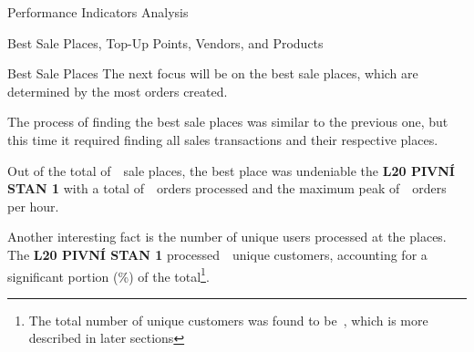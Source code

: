 \begin{section}{Performance Indicators Analysis}
\begin{subsection}{Best Sale Places, Top-Up Points, Vendors, and Products}
\begin{subsubsection}{Best Sale Places}
			The next focus will be on the best sale places, which are determined by the most orders created.


			The process of finding the best sale places was similar to the previous one, but this time it required finding all sales transactions and their respective places.

			Out of the total of~~sale places, the best place was undeniable the \textbf{L20 PIVNÍ STAN 1} with a total of~~orders processed and the maximum peak of~~orders per hour.

			Another interesting fact is the number of unique users processed at the places.
			The \textbf{L20 PIVNÍ STAN 1} processed~~unique customers, accounting for a significant portion (\%)
			of the total\footnote{The total number of unique customers was found to be~, which is more described in later sections}.


\end{subsubsection}
\end{subsection}
\end{section}
